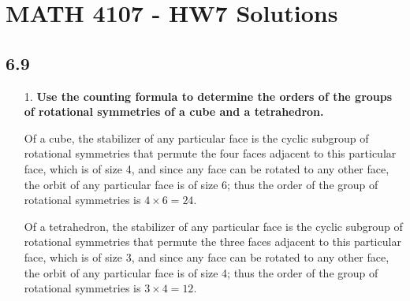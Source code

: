 \documentclass[a4paper,12pt]{article}
\begin{document}
\section*{MATH 4107 - HW7 Solutions}

\subsection*{6.9}
\begin{enumerate}
    \item[1.]
        \boldmath
        \textbf{Use the counting formula to determine the orders of the groups of rotational symmetries of a cube and a tetrahedron.} \par
        \unboldmath
        Of a cube, the stabilizer of any particular face is the cyclic subgroup of rotational symmetries that permute the four faces adjacent to this particular face, which is of size 4, and since any face can be rotated to any other face, the orbit of any particular face is of size 6; thus the order of the group of rotational symmetries is $4 \times 6 = 24$. \par
        Of a tetrahedron, the stabilizer of any particular face is the cyclic subgroup of rotational symmetries that permute the three faces adjacent to this particular face, which is of size 3, and since any face can be rotated to any other face, the orbit of any particular face is of size 4; thus the order of the group of rotational symmetries is $3 \times 4 = 12$.


\end{enumerate}
\end{document}
